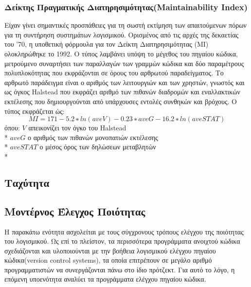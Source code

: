\documentclass[a4paper, 11pt]{article}
\begin{document}
{{\subsubsection{Δείκτης Πραγματικής Διατηρησιμότητας(\textlatin{Maintainability Index})}
Είχαν γίνει σημαντικές προσπάθειες για τη σωστή εκτίμηση των απαιτούμενων
πόρων για τη συντήρηση συστημάτων λογισμικού. Ορισμένος από τις αρχές της δεκαετίας του '70, η
υποθετική φόρμουλα για τον Δείκτη Διατηρησιμότητας (MI) ολοκληρώθηκε το 1992. Ο τύπος λαμβάνει υπόψη το μέγεθος του πηγαίου κώδικα, μετρούμενο συναρτήσει
των παραλλαγών των γραμμών κώδικα και δύο παραμέτρους πολυπλοκότητας που εκφράζονται σε
όρους του αρθρωτού παραδείγματος. Το αρθρωτό παράδειγμα είναι ο αριθμός των λειτουργιών και των χρηστών, γνωστός και ως όγκος \textlatin{Halstead} που εκφράζει αριθμό των πιθανών διαδρομών και εναλλακτικών εκτέλεσης που δημιουργούνται από υπάρχουσες εντολές συνθηκών και βρόχους.
Ο τύπος εκφράζεται ώς:
\[M I = 171 − 5.2 ∗ ln(aveV ) − 0.23 ∗ aveG − 16.2 ∗ ln(aveST AT )\] όπου:  \(V\) απεικονίζει τον όγκο του \textlatin{Halstead}\\*
\(aveG\) ο αριθμός των πιθανών μονοπατιών εκτέλεσης\\*
\(aveSTAT\) ο μέσος όρος των δηλώσεων μεταβλητών\\*



















\subsection{Ταχύτητα}

\subsection{Μοντέρνος Έλεγχος Ποιότητας}

Η παρακάτω ενότητα ασχολείται με τους σύγχρονους τρόπους ελέγχου της ποιότητας του λογισμικού. Ως επί το πλείστον, τα περισσότερα προγράμματα ανοιχτού κώδικα σχεδιάζονται και υλοποιούνται με την βοήθεια λογισμικού ελέγχου πηγαίου κώδικα(\textlatin{version control systems}), τα οποία επιτρέπουν σε μεγάλο αριθμό προγραμματιστών να συνεργάζονται πάνω στο ίδιο πρότζεκτ. Για αυτό το λόγο, η επόμενη υποενότητα αναλύει τα προγράμματα ελέγχου πηγαίου κώδικα.

}}
\end{document}
